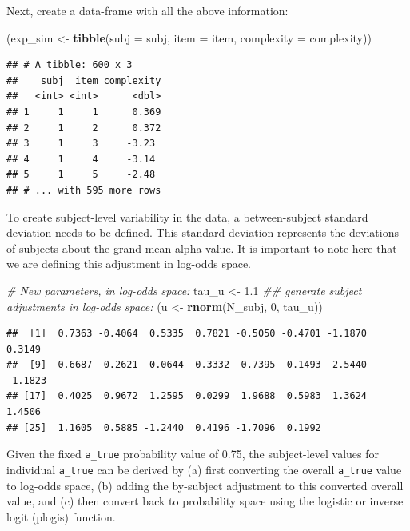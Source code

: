\documentclass[12pt,]{krantz}
\newenvironment{Shaded}{\begin{snugshade}}{\end{snugshade}}
\newcommand{\CommentTok}[1]{\textcolor[rgb]{0.56,0.35,0.01}{\textit{#1}}}
\newcommand{\DataTypeTok}[1]{\textcolor[rgb]{0.13,0.29,0.53}{#1}}
\newcommand{\DecValTok}[1]{\textcolor[rgb]{0.00,0.00,0.81}{#1}}
\newcommand{\FloatTok}[1]{\textcolor[rgb]{0.00,0.00,0.81}{#1}}
\newcommand{\KeywordTok}[1]{\textcolor[rgb]{0.13,0.29,0.53}{\textbf{#1}}}
\newcommand{\NormalTok}[1]{#1}
\newcommand{\StringTok}[1]{\textcolor[rgb]{0.31,0.60,0.02}{#1}}
\theoremstyle{definition}
\theoremstyle{definition}
\theoremstyle{definition}
\theoremstyle{remark}
\begin{document}
Next, create a data-frame with all the above information:

\begin{Shaded}
\begin{Highlighting}[]
\NormalTok{(exp_sim <-}\StringTok{ }\KeywordTok{tibble}\NormalTok{(}\DataTypeTok{subj =}\NormalTok{ subj,}
                  \DataTypeTok{item =}\NormalTok{ item,}
                  \DataTypeTok{complexity =}\NormalTok{ complexity))}
\end{Highlighting}
\end{Shaded}

\begin{verbatim}
## # A tibble: 600 x 3
##    subj  item complexity
##   <int> <int>      <dbl>
## 1     1     1      0.369
## 2     1     2      0.372
## 3     1     3     -3.23 
## 4     1     4     -3.14 
## 5     1     5     -2.48 
## # ... with 595 more rows
\end{verbatim}

To create subject-level variability in the data, a between-subject standard deviation needs to be defined. This standard deviation represents the deviations of subjects about the grand mean alpha value. It is important to note here that we are defining this adjustment in log-odds space.

\begin{Shaded}
\begin{Highlighting}[]
\CommentTok{# New parameters, in log-odds space:}
\NormalTok{tau_u <-}\StringTok{ }\FloatTok{1.1}
\CommentTok{## generate subject adjustments in log-odds space:}
\NormalTok{(u <-}\StringTok{ }\KeywordTok{rnorm}\NormalTok{(N_subj, }\DecValTok{0}\NormalTok{, tau_u))}
\end{Highlighting}
\end{Shaded}

\begin{verbatim}
##  [1]  0.7363 -0.4064  0.5335  0.7821 -0.5050 -0.4701 -1.1870  0.3149
##  [9]  0.6687  0.2621  0.0644 -0.3332  0.7395 -0.1493 -2.5440 -1.1823
## [17]  0.4025  0.9672  1.2595  0.0299  1.9688  0.5983  1.3624  1.4506
## [25]  1.1605  0.5885 -1.2440  0.4196 -1.7096  0.1992
\end{verbatim}

Given the fixed \texttt{a\_true} probability value of 0.75, the subject-level values for individual \texttt{a\_true} can be derived by (a) first converting the overall \texttt{a\_true} value to log-odds space, (b) adding the by-subject adjustment to this converted overall value, and (c) then convert back to probability space using the logistic or inverse logit (plogis) function.
\end{document}
